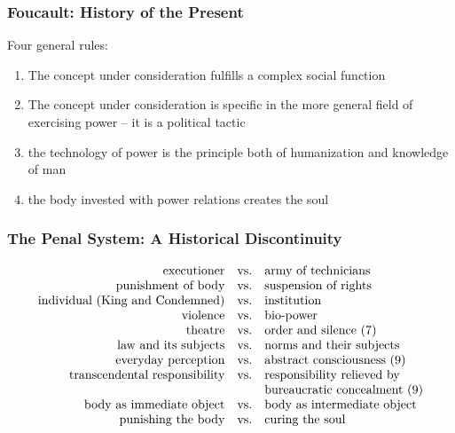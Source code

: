 \documentclass[xcolor=dvipsnames]{beamer}
\begin{document}
\begin{frame}
  \frametitle{Foucault: History of the Present}
Four general rules:
\begin{enumerate}
\item The concept under consideration fulfills a \alert{complex
    social function}
\item The concept under consideration is specific in the more
  general field of exercising power -- it is a \alert{political
    tactic}
\item the \alert{technology of power} is the principle both of
  humanization and knowledge of man
\item the body invested with power relations \alert{creates the soul}
\end{enumerate}
\end{frame}

\begin{frame}
  \frametitle{The Penal System: A Historical Discontinuity}
  \begin{equation}
    \label{eq:zeiqueex}
    \begin{array}{rcl}
      \mbox{executioner} & \mbox{vs.} & \mbox{army of technicians} \\
      \mbox{punishment of body} & \mbox{vs.} & \mbox{suspension of rights} \\
      \mbox{individual (King and Condemned)} & \mbox{vs.} & \mbox{institution} \\
      \mbox{violence} & \mbox{vs.} & \mbox{bio-power} \\
      \mbox{theatre} & \mbox{vs.} & \mbox{order and silence (7)} \\
      \mbox{law and its subjects} & \mbox{vs.} & \mbox{norms and their subjects} \\
      \mbox{everyday perception} & \mbox{vs.} & \mbox{abstract consciousness (9)} \\
      \mbox{transcendental responsibility} & \mbox{vs.} & \mbox{responsibility relieved by} \\
      \mbox{} & \mbox{} & \mbox{bureaucratic concealment (9)} \\
      \mbox{body as immediate object} & \mbox{vs.} & \mbox{body as intermediate object} \\
      \mbox{punishing the body} & \mbox{vs.} & \mbox{curing the soul} \\
    \end{array}\notag
  \end{equation}
\end{frame}
\end{document}
